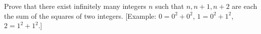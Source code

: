 Prove that there exist infinitely many integers $n$ such that
$n,n+1,n+2$ are each the sum of the squares of two integers.
[Example: $0=0^2+0^2$, $1=0^2+1^2$, $2=1^2+1^2$.]

